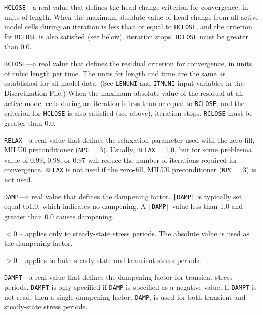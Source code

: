 \documentclass[12pt]{article} %
\begin{document}
\begin{description}
\item \texttt{HCLOSE}---a real value that defines the head change criterion for convergence, in units of length. When the maximum absolute value of head change from all active model cells during an iteration is less than or equal to \texttt{HCLOSE}, and the criterion for \texttt{RCLOSE} is also satisfied (see below), iteration stops. \texttt{HCLOSE} must be greater than 0.0.
\item \texttt{RCLOSE}---a real value that defines the residual criterion for convergence, in units of cubic length per time. The units for length and time are the same as established for all model data.  (See \texttt{LENUNI} and \texttt{ITMUNI} input variables in the Discretization File.)  When the maximum absolute value of the residual at all active model cells during an iteration is less than or equal to \texttt{RCLOSE}, and the criterion for \texttt{HCLOSE} is also satisfied (see above), iteration stops. \texttt{RCLOSE} must be greater than 0.0.
\item \texttt{RELAX}---a real value that defines the relaxation parameter used with the zero-fill, MILU0 preconditioner (\texttt{NPC} = 3). Usually, \texttt{RELAX} = 1.0, but for some problesma value of 0.99, 0.98, or 0.97 will reduce the number of iterations required for convergence. \texttt{RELAX} is not used if the zero-fill, MILU0 preconditioner (\texttt{NPC} = 3) is not used.
\item \texttt{DAMP}---a real value that defines the dampening factor. \texttt{|DAMP|} is typically set equal to1.0, which indicates no dampening. A \texttt{|DAMP|} value less than 1.0 and greater than 0.0 causes dampening.
\begin{description}
	\item $<$0 -- applies only to steady-state stress periods. The absolute value is used as the dampening factor.
	\item $>$0 -- applies to both steady-state and transient stress periods.
\end{description}
\item \texttt{DAMPT}---a real value that defines the dampening factor for transient stress periods. \texttt{DAMPT} is only specified if \texttt{DAMP} is specified as a negative value. If \texttt{DAMPT} is not read, then a single dampening factor, \texttt{DAMP}, is used for both transient and steady-state stress periods.


\end{description}
\end{document}
